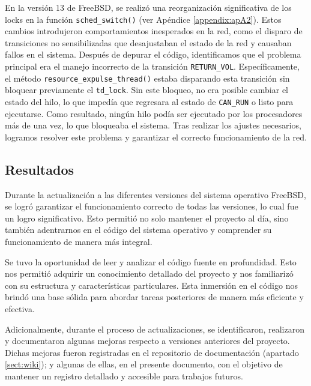 En la versión 13 de FreeBSD, se realizó una reorganización significativa de los locks en la función \verb|sched_switch()| (ver Apéndice \ref{appendix:apA2}). Estos cambios introdujeron comportamientos inesperados en la red, como el disparo de transiciones no sensibilizadas que desajustaban el estado de la red y causaban fallos en el sistema. Después de depurar el código, identificamos que el problema principal era el manejo incorrecto de la transición \verb|RETURN_VOL|. Específicamente, el método \verb|resource_expulse_thread()| estaba disparando esta transición sin bloquear previamente el \verb|td_lock|. Sin este bloqueo, no era posible cambiar el estado del hilo, lo que impedía que regresara al estado de \verb|CAN_RUN| o listo para ejecutarse. Como resultado, ningún hilo podía ser ejecutado por los procesadores más de una vez, lo que bloqueaba el sistema. Tras realizar los ajustes necesarios, logramos resolver este problema y garantizar el correcto funcionamiento de la red.\par

\subsection{Resultados}

Durante la actualización a las diferentes versiones del sistema operativo FreeBSD, se logró garantizar el funcionamiento correcto de todas las versiones, lo cual fue un logro significativo. Esto permitió no solo mantener el proyecto al día, sino también adentrarnos en el código del sistema operativo y comprender su funcionamiento de manera más integral.\par

Se tuvo la oportunidad de leer y analizar el código fuente en profundidad. Esto nos permitió adquirir un conocimiento detallado del proyecto y nos familiarizó con su estructura y características particulares. Esta inmersión en el código nos brindó una base sólida para abordar tareas posteriores de manera más eficiente y efectiva.\par

Adicionalmente, durante el proceso de actualizaciones, se identificaron, realizaron y documentaron algunas mejoras respecto a versiones anteriores del proyecto. Dichas mejoras fueron registradas en el repositorio de documentación (apartado \ref{sect:wiki}); y algunas de ellas, en el presente documento, con el objetivo de mantener un registro detallado y accesible para trabajos futuros.\par

